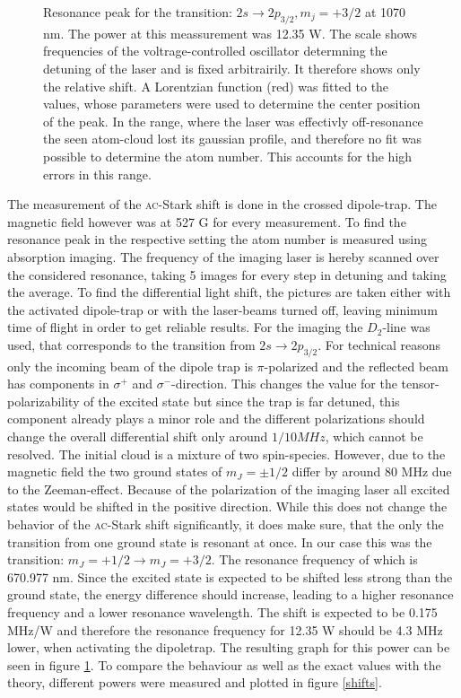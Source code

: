 \begin{figure}[h]
\caption{Resonance peak for the transition: $2s\rightarrow2p_{3/2}, m_j=+3/2$ at 1070 nm. The power at this meassurement was 12.35 W. The scale shows frequencies of the voltrage-controlled oscillator determning the detuning of the laser and is fixed arbitrairily. It therefore shows only the relative shift. A Lorentzian function (red) was fitted to the values, whose parameters were used to determine the center position of the peak. In the range, where the laser was effectivly off-resonance the seen atom-cloud lost its gaussian profile, and therefore no fit was possible to determine the atom number. This accounts for the high errors in this range.}
\label{resonance}
\end{figure}

The measurement of the \textsc{ac}-Stark shift is done in the crossed dipole-trap. The magnetic field however was at 527 G for every measurement. To find the resonance peak in the respective setting the atom number is measured using absorption imaging. The frequency of the imaging laser is hereby scanned over the considered resonance, taking 5 images for every step in detuning and taking the average. To find the differential light shift, the pictures are taken either with the activated dipole-trap or with the laser-beams turned off, leaving minimum time of flight in order to get reliable results. For the imaging the $D_2$-line was used, that corresponds to the transition from  $2s\rightarrow2p_{3/2}$. For technical reasons only the incoming beam of the dipole trap is $\pi$-polarized and the reflected beam has components in \(\sigma^+\) and \(\sigma^-\)-direction. This changes the value for the tensor-polarizability of the excited state but since the trap is far detuned, this component already plays a minor role and the different polarizations should change the overall differential shift only around $1/10 {MHz}$, which cannot be resolved. The initial cloud is a mixture of two spin-species. However, due to the magnetic field the two ground states of $m_J=\pm 1/2$ differ by around 80 MHz due to the Zeeman-effect. Because of the polarization of the imaging laser all excited states would be shifted in the positive direction. While this does not change the behavior of the \textsc{ac}-Stark shift significantly, it does make sure, that the only the transition from one ground state is resonant at once. In our case this was the transition: $m_J=+1/2 \rightarrow m_J=+3/2$.  The resonance frequency of which is 670.977 nm. Since the excited state is expected to be shifted less strong than the ground state, the energy difference should increase, leading to a higher resonance frequency and a lower resonance wavelength. The shift is expected to be 0.175 MHz/W and therefore the resonance frequency for 12.35 W should be 4.3 MHz lower, when activating the dipoletrap. The resulting graph for this power can be seen in figure \ref{resonance}. To compare the behaviour as well as the exact values with the theory, different powers were measured and plotted in figure \ref{shifts}. 

